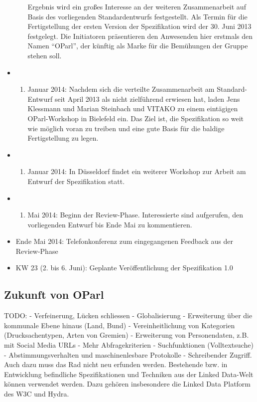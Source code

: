 \documentclass[,a4paper]{article}
\begin{document}
\begin{itemize}
\begin{enumerate}
    Ergebnis wird ein großes Interesse an der weiteren Zusammenarbeit
    auf Basis des vorliegenden Standardentwurfs festgestellt. Als Termin
    für die Fertigstellung der ersten Version der Spezifikation wird der
    30. Juni 2013 festgelegt. Die Initiatoren präsentieren den
    Anwesenden hier erstmals den Namen ``OParl'', der künftig als Marke
    für die Bemühungen der Gruppe stehen soll.
  \end{enumerate}
\item
  \begin{enumerate}
  \def\labelenumi{\arabic{enumi}.}
  \setcounter{enumi}{21}
  \itemsep1pt\parskip0pt
  \item
    Januar 2014: Nachdem sich die verteilte Zusammenarbeit am
    Standard-Entwurf seit April 2013 als nicht zielführend erwiesen hat,
    laden Jens Klessmann und Marian Steinbach und VITAKO zu einem
    eintägigen OParl-Workshop in Bielefeld ein. Das Ziel ist, die
    Spezifikation so weit wie möglich voran zu treiben und eine gute
    Basis für die baldige Fertigstellung zu legen.
  \end{enumerate}
\item
  \begin{enumerate}
  \def\labelenumi{\arabic{enumi}.}
  \setcounter{enumi}{25}
  \itemsep1pt\parskip0pt
  \item
    Januar 2014: In Düsseldorf findet ein weiterer Workshop zur Arbeit
    am Entwurf der Spezifikation statt.
  \end{enumerate}
\item
  \begin{enumerate}
  \def\labelenumi{\arabic{enumi}.}
  \itemsep1pt\parskip0pt
  \item
    Mai 2014: Beginn der Review-Phase. Interessierte sind aufgerufen,
    den vorliegenden Entwurf bis Ende Mai zu kommentieren.
  \end{enumerate}
\item
  Ende Mai 2014: Telefonkonferenz zum eingegangenen Feedback aus der
  Review-Phase
\item
  KW 23 (2. bis 6. Juni): Geplante Veröffentlichung der Spezifikation
  1.0
\end{itemize}

\subsection{Zukunft von OParl}\label{zukunft-von-oparl}

TODO: - Verfeinerung, Lücken schliessen - Globalisierung - Erweiterung
über die kommunale Ebene hinaus (Land, Bund) - Vereinheitlichung von
Kategorien (Drucksachentypen, Arten von Gremien) - Erweiterung von
Personendaten, z.B. mit Social Media URLs - Mehr Abfragekriterien -
Suchfunktionen (Volltextsuche) - Abstimmungsverhalten und
maschinenlesbare Protokolle - Schreibender Zugriff. Auch dazu muss das
Rad nicht neu erfunden werden. Bestehende bzw. in Entwicklung
befindliche Spezifikationen und Techniken aus der Linked Data-Welt
können verwendet werden. Dazu gehören insbesondere die Linked Data
Platform des W3C und Hydra.
\end{document}
